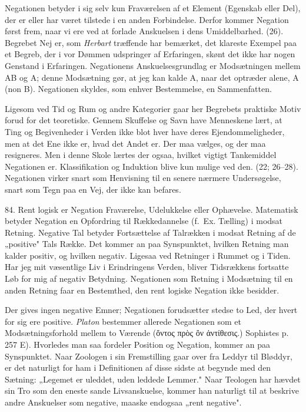 \documentclass[12pt,a4paper]{book}
\newcommand{\apage}[1]{\marginnote{\footnotesize\textit{[#1]}}}
\begin{document}
Negationen betyder i sig selv kun Fraværelsen af et Element (Egenskab eller Del),
der er eller har været tilstede i en anden Forbindelse. Derfor kommer Negation
først frem, naar vi ere ved at forlade Anskuelsen i dens Umiddelbarhed. (26).
Begrebet Nej er, som \emph{Herbart} træffende har bemærket, det klareste Exempel
paa et Begreb, der i vor Dømmen udspringer af Erfaringen, skønt det ikke har
nogen Genstand i Erfaringen. Negationens Anskuelsesgrundlag er Modsætningen
mellem AB og A; denne Modsætning gør, at jeg kan kalde A, naar det optræder
alene, A (non B). Negationen skyldes, som enhver Bestemmelse, en Sammenfatten.

Ligesom ved Tid og Rum og andre Kategorier gaar her Begrebets praktiske Motiv
forud for det teoretiske. Gennem Skuffelse og Savn have Menneskene lært, at Ting
og Begivenheder i Verden ikke blot hver have deres Ejendommeligheder, men at det
Ene ikke er, hvad det Andet er. \apage{203} Der maa vælges, og der maa resigneres. Men i
denne Skole lærtes der ogsaa, hvilket vigtigt Tankemiddel Negationen er.
Klassifikation og Induktion blive kun mulige ved den. (22; 26--28). Negationen
virker snart som Henvisning til en senere nærmere Undersøgelse, snart som Tegn
paa en Vej, der ikke kan befares.

84. Rent logisk er Negation Fraværelse, Udelukkelse eller Ophævelse. Matematisk
betyder Negation en Opfordring til Rækkedannelse (f.\ Ex. Tælling) i modsat
Retning. Negative Tal betyder Fortsættelse af Talrækken i modsat Retning af de
„positive" Tals Række. Det kommer an paa Synspunktet, hvilken Retning man kalder
positiv, og hvilken negativ. Ligesaa ved Retninger i Rummet og i Tiden. Har jeg
mit væsentlige Liv i Erindringens Verden, bliver Tidsrækkens fortsatte Løb for
mig af negativ Betydning. Negationen som Retning i Modsætning til en anden
Retning faar en Bestemthed, den rent logiske Negation ikke besidder.

Der gives ingen negative Emner; Negationen forudsætter stedse to Led, der hvert
for sig ere positive. \emph{Platon} bestemmer allerede Negationen som et
Modsætningsforhold mellem to Værende (ὄντος πρὸς ὂν ἀντίθεσις.) Sophistes
p. 257 E). Hvorledes man saa fordeler Position og Negation, kommer an paa
Synspunktet. Naar Zoologen i sin Fremstilling gaar over fra Leddyr til Bløddyr,
er det naturligt for ham i Definitionen af disse sidste at begynde med den
Sætning: „Legemet er uleddet, uden leddede Lemmer." Naar Teologen har hævdet sin
Tro som den eneste sande Livsanskuelse, kommer han naturligt til at beskrive
andre Anskuelser som negative, maaske endogsaa „rent negative".
\end{document}
